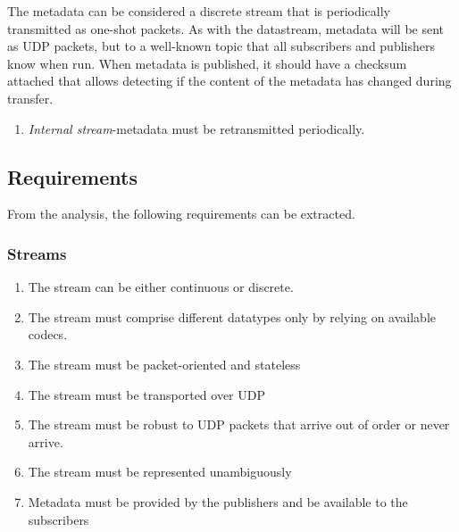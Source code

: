 The metadata can be considered a discrete stream that is periodically transmitted as one-shot packets.
As with the datastream, metadata will be sent as UDP packets, but to a well-known topic that all subscribers and publishers know when run.
When metadata is published, it should have a checksum attached that allows detecting if the content of the metadata has changed during transfer.

\begin{enumerate}
	\item \textit{Internal stream}-metadata must be retransmitted periodically.
\end{enumerate}


\subsection{Requirements}
From the analysis, the following requirements can be extracted.
\subsubsection{Streams}
\begin{enumerate}
	\item The stream can be either continuous or discrete.
	\item The stream must comprise different datatypes only by relying on available codecs.
	\item The stream must be packet-oriented and stateless
	\item The stream must be transported over UDP
	\item The stream must be robust to UDP packets that arrive out of order or never arrive.
	\item The stream must be represented unambiguously
	\item Metadata must be provided by the publishers and be available to the subscribers 
\end{enumerate}


